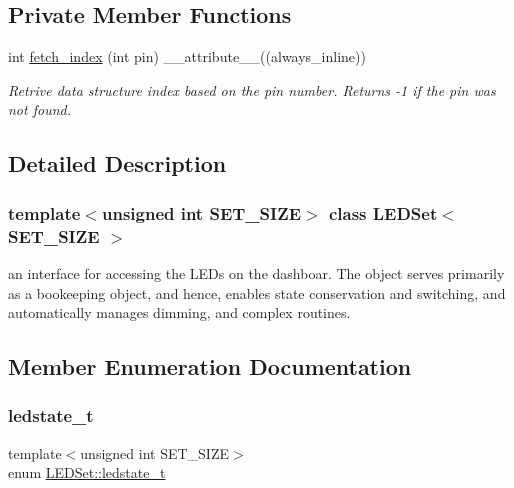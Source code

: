 \subsection*{Private Member Functions}
\begin{DoxyCompactItemize}
\item 
int \hyperlink{classLEDSet_a4ffb3b4a8a5cffdc03f4040ff67a33e9}{fetch\+\_\+index} (int pin) \+\_\+\+\_\+attribute\+\_\+\+\_\+((always\+\_\+inline))
\begin{DoxyCompactList}\small\item\em Retrive data structure index based on the pin number. Returns -\/1 if the pin was not found. \end{DoxyCompactList}\end{DoxyCompactItemize}


\subsection{Detailed Description}
\subsubsection*{template$<$unsigned int S\+E\+T\+\_\+\+S\+I\+ZE$>$\newline
class L\+E\+D\+Set$<$ S\+E\+T\+\_\+\+S\+I\+Z\+E $>$}

an interface for accessing the L\+E\+Ds on the dashboar. The object serves primarily as a bookeeping object, and hence, enables state conservation and switching, and automatically manages dimming, and complex routines. 

\subsection{Member Enumeration Documentation}
\mbox{\label{classLEDSet_ae26a13b2d33c51351bc6d0acdf2a94a4}} 
\subsubsection{\texorpdfstring{ledstate\+\_\+t}{ledstate\_t}}
{\footnotesize\ttfamily template$<$unsigned int S\+E\+T\+\_\+\+S\+I\+ZE$>$ \\
enum \hyperlink{classLEDSet_ae26a13b2d33c51351bc6d0acdf2a94a4}{L\+E\+D\+Set\+::ledstate\+\_\+t}}

